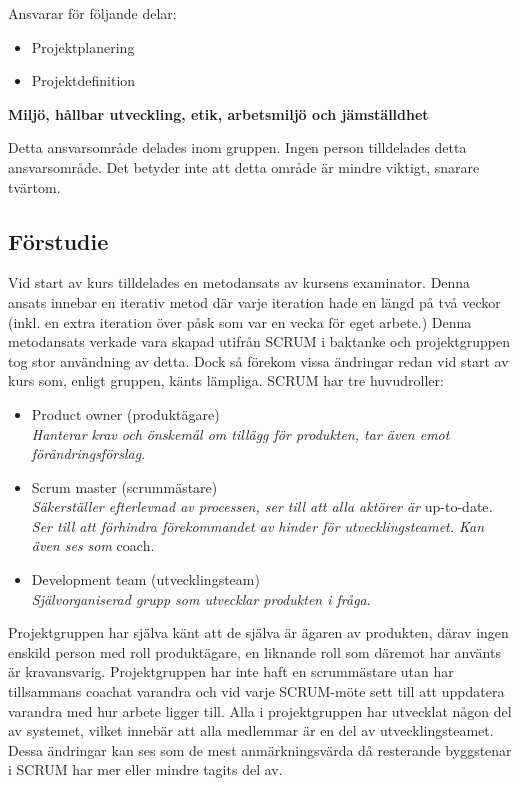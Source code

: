 \documentclass[conference]{IEEEtran}
\begin{document}
Ansvarar för följande delar: 
\begin{itemize}
    \item Projektplanering
    \item Projektdefinition
\end{itemize}


\textbf{Miljö, hållbar utveckling, etik, arbetsmiljö och jämställdhet}

Detta ansvarsområde delades inom gruppen. Ingen person tilldelades detta ansvarsområde. Det betyder inte att detta område är mindre viktigt, snarare tvärtom.

\subsection{Förstudie}
Vid start av kurs tilldelades en metodansats av kursens examinator. Denna ansats innebar en iterativ metod där varje iteration hade en längd på två veckor (inkl. en 
extra iteration över påsk som var en vecka för eget arbete.) Denna metodansats verkade vara skapad utifrån SCRUM i baktanke och projektgruppen tog stor användning av detta. 
Dock så förekom vissa ändringar redan vid start av kurs som, enligt gruppen, känts lämpliga. 
SCRUM har tre huvudroller: 
\begin{itemize}
    \item Product owner (produktägare)\\
    \textit{Hanterar krav och önskemål om tillägg för produkten, tar även emot förändringsförslag}.
    \item Scrum master (scrummästare)\\
    \textit{Säkerställer efterlevnad av processen, ser till att alla aktörer är} up-to-date\textit{. Ser till att förhindra förekommandet av hinder för utvecklingsteamet. Kan även ses som} coach.
    \item Development team (utvecklingsteam)\\
    \textit{Självorganiserad grupp som utvecklar produkten i fråga}.
\end{itemize}

Projektgruppen har själva känt att de själva är ägaren av produkten, därav ingen enskild person med roll produktägare, 
en liknande roll som däremot har använts är kravansvarig. Projektgruppen har inte haft en scrummästare utan har tillsammans 
coachat varandra och vid varje SCRUM-möte sett till att uppdatera varandra med hur arbete ligger till. 
Alla i projektgruppen har utvecklat någon del av systemet, vilket innebär att alla medlemmar är en del av utvecklingsteamet. 
Dessa ändringar kan ses som de mest anmärkningsvärda då resterande byggstenar i SCRUM har mer eller mindre tagits del av.\\
\end{document}
